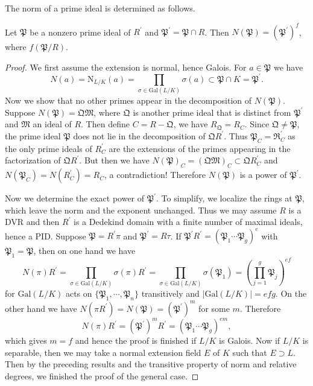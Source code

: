 The norm of a prime ideal is determined as follows.
\begin{proposition}\label{ExtPrimeNorm}
Let $\mathfrak{P}$ be a nonzero prime ideal of $R^\prime$ and $\mathfrak{P}^\prime=\mathfrak{P}\cap R$. Then $N(\mathfrak{P})=(\mathfrak{P}^\prime)^f$, where $f(\mathfrak{P}/R)$.
\end{proposition}
\begin{proof}
We first assume the extension is normal, hence Galois. For $a\in\mathfrak{P}$ we have 
$$
N\left( a \right) =\mathrm{N}_{L/K}\left( a \right) =\prod_{\sigma \in \mathrm{Gal}\left( L/K \right)}{\sigma \left( a \right)}\subset \mathfrak{P} \cap K=\mathfrak{P} ^{\prime}.
$$
Now we show that no other primes appear in the decomposition of $N(\mathfrak{P})$. Suppose $N(\mathfrak{P})=\mathfrak{QM}$, where $\mathfrak{Q}$ is another prime ideal that is distinct from $\mathfrak{P}^\prime$ and $\mathfrak{M}$ an ideal of $R$. Then define $C=R-\mathfrak{Q}$, we have $R_\mathfrak{Q}=R_C$. Since $\mathfrak{Q}\ne\mathfrak{P}$, the prime ideal $\mathfrak{P}$ does not lie in the decomposition of $\mathfrak{Q}R^\prime$. Thus $\mathfrak{P}_C=\mathfrak{R}^\prime_C$ as the only prime ideals of $R_C^\prime$ are the extensions of the primes appearing in the factorization of $\mathfrak{Q}R^\prime$. But then we have $N(\mathfrak{P})_C=(\mathfrak{QM})_C\subset\mathfrak{Q}R_C^\prime$ and $N(\mathfrak{P}_C)=N(R_C^\prime)=R_C$, a contradiction! Therefore $N(\mathfrak{P})$ is a power of $\mathfrak{P}^\prime$.\par
Now we determine the exact power of $\mathfrak{P}^\prime$. To simplify, we localize the rings at $\mathfrak{P}$, which leave the norm and the exponent unchanged. Thus we may assume $R$ is a DVR and then $R^\prime$ is a Dedekind domain with a finite number of maximal ideals, hence a PID. Suppose $\mathfrak{P}=R^\prime\pi$ and $\mathfrak{P}^\prime=R\tau$. If $\mathfrak{P}^\prime R^\prime=(\mathfrak{P}_1\cdots\mathfrak{P}_g)^e$ with $\mathfrak{P}_1=\mathfrak{P}$, then on one hand we have 
$$
N\left( \pi \right) R^{\prime}=\prod_{\sigma \in \mathrm{Gal}\left( L/K \right)}{\sigma \left( \pi \right)}R^{\prime}=\prod_{\sigma \in \mathrm{Gal}\left( L/K \right)}{\sigma \left( \mathfrak{P} _1 \right)}=\left( \prod_{j=1}^g{\mathfrak{P} _j} \right) ^{ef}
$$
for $\mathrm{Gal}(L/K)$ acts on $\{\mathfrak{P}_1,\cdots,\mathfrak{P}_n\}$ transitively and $|\mathrm{Gal}(L/K)|=efg$. On the other hand we have $N(\pi R^\prime)=N(\mathfrak{P})=(\mathfrak{P}^\prime)^m$ for some $m$. Therefore 
$$
N\left( \pi \right) R^{\prime}=\left( \mathfrak{P} ^{\prime} \right) ^mR^{\prime}=\left( \mathfrak{P} _1\cdots \mathfrak{P} _g \right) ^{em},
$$
which gives $m=f$ and hence the proof is finished if $L/K$ is Galois. Now if $L/K$ is separable, then we may take a normal extension field $E$ of $K$ such that $E\supset L$. Then by the preceding results and the transitive property of norm and relative degrees, we finished the proof of the general case.
\end{proof}
